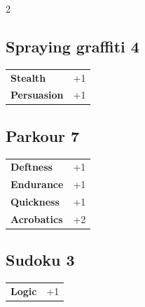 \begin{multicols}{2}
\begin{tcolorbox}
    \subsection*{Spraying graffiti \hfill \small{4 }}
    \tcblower




\begin{tabular}{@{}ll@{}}
    \textbf{Stealth} & +1\\
    \textbf{Persuasion} & +1\\
\end{tabular}


\end{tcolorbox}

\begin{tcolorbox}
    \subsection*{Parkour \hfill \small{7 }}
    \tcblower




\begin{tabular}{@{}ll@{}}
    \textbf{Deftness} & +1\\
    \textbf{Endurance} & +1\\
    \textbf{Quickness} & +1\\
    \textbf{Acrobatics} & +2\\
\end{tabular}


\end{tcolorbox}

\begin{tcolorbox}
    \subsection*{Sudoku \hfill \small{3 }}
    \tcblower




\begin{tabular}{@{}ll@{}}
    \textbf{Logic} & +1\\
\end{tabular}


\end{tcolorbox}
\end{multicols}
